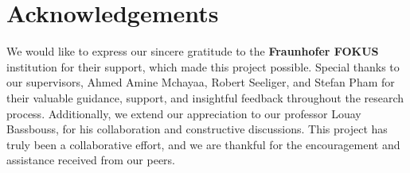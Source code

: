 \label{sec:acknowledgements}

\section*{Acknowledgements}

We would like to express our sincere gratitude to the \textbf{Fraunhofer FOKUS} institution for their support, which made this project possible. Special thanks to our supervisors, Ahmed Amine Mchayaa, Robert Seeliger, and Stefan Pham for their valuable guidance, support, and insightful feedback throughout the research process. Additionally, we extend our appreciation to our professor Louay Bassbouss, for his collaboration and constructive discussions. This project has truly been a collaborative effort, and we are thankful for the encouragement and assistance received from our peers. 

